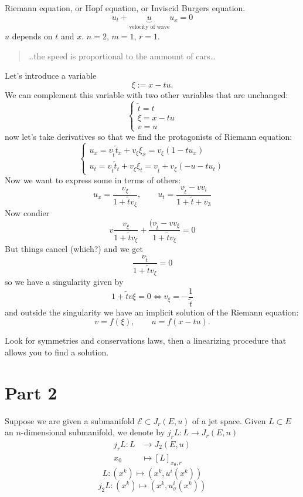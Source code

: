 \begin{example}\leavevmode
	Riemann equation, or Hopf equation, or Inviscid Burgers equation.
	\[u_t+\underbrace{u}_{\text{velocity of wave} } u_x=0\]
	$u$ depends on $t$ and $x$. $n=2$,  $m=1$,  $r=1$.

\begin{quotation}
	…the speed is proportional to the ammount of cars…
\end{quotation}
Let's introduce a variable
\[\xi:=x-tu.\]
We can complement this variable with two other variables that are unchanged:
\[\begin{cases}
	\tilde{t}=t\\
	\xi=x-tu\\
	v=u
\end{cases}\]
now let's take derivatives so that we find the protagonists of Riemann equation:
\[\begin{cases}
	u_x=v_{\tilde{t}}\tilde{t}_x+v_\xi \xi_x=v_\xi(1-tu_x)\\
u_t=v_{\tilde{t}}\tilde{t}_t+v_\xi \xi_t=v_{\tilde{t}}+v_\xi(-u-tu_t)
\end{cases}\]
Now we want to express some in terms of others:
 \[u_x=\frac{v_\xi}{1+\tilde{t}v_\xi},\qquad  u_t=\frac{v_{\tilde{t}}-v v_i}{1+\tilde{t}+v_3}\]
 Now condier
 \[v\frac{v_\xi}{1+\tilde{t}v_\xi}+\frac{(v_{\tilde{t}}-v v_\xi}{1+\tilde{t}v_\xi}=0\]
 But things cancel (which?) and we get
 \[\frac{v_{\tilde{t}}}{1+\tilde{t}v_\xi}=0\]
 so we have a singularity given by
 \[1+\tilde{t}v\xi=0 \iff v_\xi=-\frac{1}{\tilde{t}}\]
 and outside the singularity we have an implicit solution of the Riemann equation:
 \[v=f(\xi),\qquad u=f(x-tu).\]
\end{example}

\begin{upshot}\leavevmode
	Look for symmetries and conservations laws, then a linearizing procedure that allows you to find a solution.
\end{upshot}

\section{Part 2}

Suppose we are given a submanifold $\mathcal{E} \subset J_r(E,u)$ of a jet space. Given $L \subset E$ an $n$-dimensional submanifold, we denote by $j_rL: L \to J_r(E,n)$
\begin{align*}
	j_rL: L &\longrightarrow J_2(E,u) \\
	x_0 &\longmapsto [L]_{x_0,r}
\end{align*}
 \[L:(x^k)\mapsto (x^k,u^i(x^k))\]
 \[j_2L:(x^k)\mapsto (x^k,u^i_\sigma(x^k))\]

